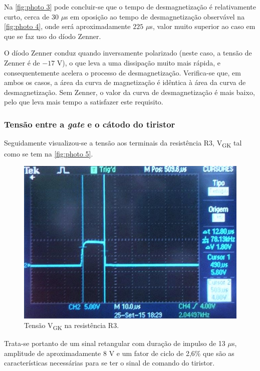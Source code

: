 \documentclass[a4paper,11pt]{article}
\numberwithin{equation}{section}
\begin{document}
Na \autoref{fig:photo 3} pode concluir-se que o tempo de desmagnetização é relativamente curto, cerca de $30$ $\mu$s em oposição ao tempo de desmagnetização observável na \autoref{fig:photo 4}, onde será aproximadamente $225$ $\mu$s, valor muito superior ao caso em que se faz uso do díodo Zenner.

O díodo Zenner conduz quando inversamente polarizado (neste caso, a tensão de Zenner é de $-17$ V), o que leva a uma dissipação muito mais rápida, e consequentemente acelera o processo de desmagnetização. Verifica-se que, em ambos os casos, a área da curva de magnetização é idêntica à área da curva de desmagnetização. Sem Zenner, o valor da curva de desmagnetização é mais baixo, pelo que leva mais tempo a satisfazer este requisito. 

\subsubsection{Tensão entre a \textit{gate} e o cátodo do tiristor}

Seguidamente visualizou-se a tensão aos terminais da resistência R$3$,  V\textsubscript{GK} tal como se tem na \autoref{fig:photo 5}.

\begin{figure}[h]
	\centering
	\includegraphics[keepaspectratio=true, scale=0.63]{img/fig8}
	\caption{Tensão V\textsubscript{GK} na resistência R$3$.}
	\label{fig:photo 5}
	\vspace{-0.8em}
\end{figure}

Trata-se portanto de um sinal retangular com duração de impulso de 13 $\mu$s, amplitude de aproximadamente 8 V e um fator de ciclo de 2,6\% que são as características necessárias para se ter o sinal de comando do tiristor.
\end{document}
